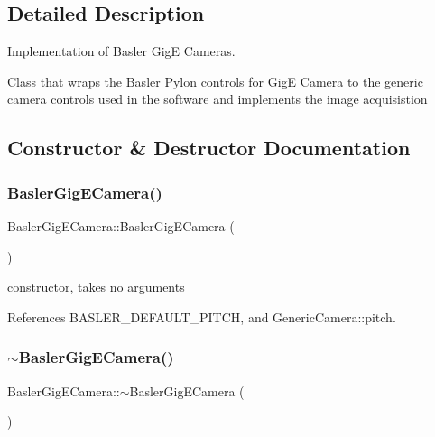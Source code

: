 \subsection{Detailed Description}
Implementation of Basler GigE Cameras. 

Class that wraps the Basler Pylon controls for GigE Camera to the generic camera controls used in the software and implements the image acquisistion 

\subsection{Constructor \& Destructor Documentation}
\mbox{\label{classBaslerGigECamera_a4e73954bf129084f8ad3aae41eb07ed5}} 
\subsubsection{\texorpdfstring{Basler\+Gig\+E\+Camera()}{BaslerGigECamera()}}
{\footnotesize\ttfamily Basler\+Gig\+E\+Camera\+::\+Basler\+Gig\+E\+Camera (\begin{DoxyParamCaption}{ }\end{DoxyParamCaption})}

constructor, takes no arguments 

References B\+A\+S\+L\+E\+R\+\_\+\+D\+E\+F\+A\+U\+L\+T\+\_\+\+P\+I\+T\+CH, and Generic\+Camera\+::pitch.

\mbox{\label{classBaslerGigECamera_a0dbeed22c6adda8a9a9e7172a1a3f7ea}} 
\subsubsection{\texorpdfstring{$\sim$\+Basler\+Gig\+E\+Camera()}{~BaslerGigECamera()}}
{\footnotesize\ttfamily Basler\+Gig\+E\+Camera\+::$\sim$\+Basler\+Gig\+E\+Camera (\begin{DoxyParamCaption}{ }\end{DoxyParamCaption})}

